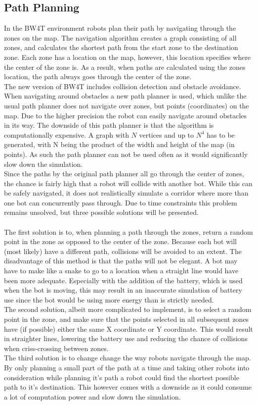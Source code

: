 \documentclass{article}
\begin{document}
\subsection*{Path Planning}
In the BW4T environment robots plan their path by navigating through the zones on the map. The navigation algorithm creates a graph consisting of all zones, and calculates the shortest path from the start zone to the destination zone. Each zone has a location on the map, however, this location specifies where the center of the zone is. As a result, when paths are calculated using the zones location, the path always goes through the center of the zone. \\
The new version of BW4T includes collision detection and obstacle avoidance. When navigating around obstacles a new path planner is used, which unlike the usual path planner does not navigate over zones, but points (coordinates) on the map. Due to the higher precision the robot can easily navigate around obstacles in its way. The downside of this path planner is that the algorithm is computationally expensive. A graph with $N$ vertices and up to $N^4$ has to be generated, with N being the product of the width and height of the map (in points). As such the path planner can not be used often as it would significantly slow down the simulation. \\
Since the paths by the original path planner all go through the center of zones, the chance is fairly high that a robot will collide with another bot. While this can be safely navigated, it does not realistically simulate a corridor where more than one bot can concurrently pass through. Due to time constraints this problem remains unsolved, but three possible solutions will be presented. \\
\\
The first solution is to, when planning a path through the zones, return a random point in the zone as opposed to the center of the zone. Because each bot will (most likely) have a different path, collisions will be avoided to an extent. The disadvantage of this method is that the paths will not be elegant. A bot may have to make like a snake to go to a location when a straight line would have been more adequate. Especially with the addition of the battery, which is used when the bot is moving, this may result in an inaccurate simulation of battery use since the bot would be using more energy than is strictly needed. \\
The second solution, albeit more complicated to implement, is to select a random point in the zone, and make sure that the points selected in all subsequent zones have (if possible) either the same X coordinate or Y coordinate. This would result in straighter lines, lowering the battery use and reducing the chance of collisions when criss-crossing between zones. \\
The third solution is to change change the way robots navigate through the map. By only planning a small part of the path at a time and taking other robots into consideration while planning it's path a robot could find the shortest possible path to it's destination. This however comes with a downside as it could consume a lot of computation power and slow down the simulation.
\end{document}
